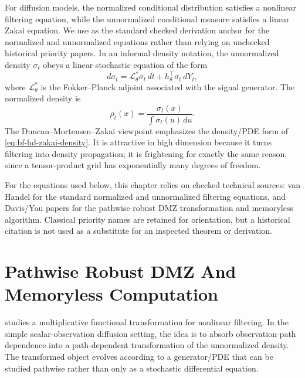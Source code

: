 For diffusion models, the normalized conditional distribution satisfies a
nonlinear filtering equation, while the unnormalized conditional measure
satisfies a linear Zakai equation.  We use \citet{vanhandel2007filtering} as the
standard checked derivation anchor for the normalized and unnormalized
equations rather than relying on unchecked historical priority papers.  In an
informal density notation, the unnormalized density $\sigma_t$ obeys a linear
stochastic equation of the form
\begin{equation}
  d\sigma_t
  =
  \mathcal L_\theta^\ast \sigma_t\,dt
  + h_\theta^\top \sigma_t\,dY_t,
  \label{eq:bf-hd-zakai-density}
\end{equation}
where $\mathcal L_\theta^\ast$ is the Fokker--Planck adjoint associated with the
signal generator.  The normalized density is
\begin{equation}
  \rho_t(x)=\frac{\sigma_t(x)}{\int \sigma_t(u)\,du}.
  \label{eq:bf-hd-normalize-zakai}
\end{equation}
The Duncan--Mortensen--Zakai viewpoint emphasizes the density/PDE form of
\eqref{eq:bf-hd-zakai-density}.  It is attractive in high dimension because it
turns filtering into density propagation; it is frightening for exactly the same
reason, since a tensor-product grid has exponentially many degrees of freedom.

\begin{remark}
For the equations used below, this chapter relies on checked technical sources:
van Handel for the standard normalized and unnormalized filtering equations, and
Davis/Yau papers for the pathwise robust DMZ transformation and memoryless
algorithm.  Classical priority names are retained for orientation, but a
historical citation is not used as a substitute for an inspected theorem or
derivation.
\end{remark}

\section{Pathwise Robust DMZ And Memoryless Computation}
\label{sec:bf-hd-pathwise-dmz}

\citet{davis1980multiplicative} studies a multiplicative functional
transformation for nonlinear filtering.  In the simple scalar-observation
diffusion setting, the idea is to absorb observation-path dependence into a
path-dependent transformation of the unnormalized density.  The transformed
object evolves according to a generator/PDE that can be studied pathwise rather
than only as a stochastic differential equation.

